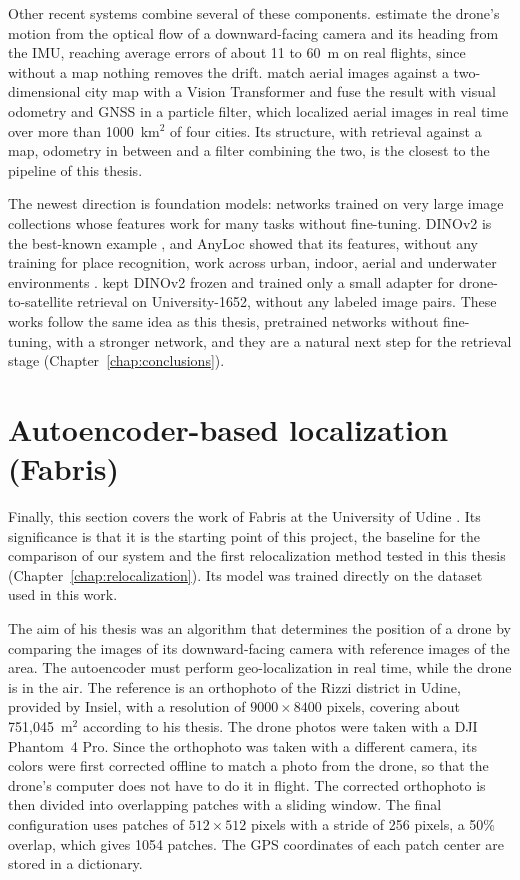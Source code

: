 \documentclass[english, Lau, oneside]{sapthesis}%
\begin{document}
Other recent systems combine several of these components. \citet{walczak2025fusion} estimate the drone's motion from the optical flow of a downward-facing camera and its heading from the IMU, reaching average errors of about 11 to 60~m on real flights, since without a map nothing removes the drift. \citet{tang2025citylevel} match aerial images against a two-dimensional city map with a Vision Transformer and fuse the result with visual odometry and GNSS in a particle filter, which localized aerial images in real time over more than 1000~km$^2$ of four cities. Its structure, with retrieval against a map, odometry in between and a filter combining the two, is the closest to the pipeline of this thesis.

The newest direction is foundation models: networks trained on very large image collections whose features work for many tasks without fine-tuning. DINOv2 is the best-known example \citep{oquab2023dinov2}, and AnyLoc showed that its features, without any training for place recognition, work across urban, indoor, aerial and underwater environments \citep{keetha2023anyloc}. \citet{li2024crossview} kept DINOv2 frozen and trained only a small adapter for drone-to-satellite retrieval on University-1652, without any labeled image pairs. These works follow the same idea as this thesis, pretrained networks without fine-tuning, with a stronger network, and they are a natural next step for the retrieval stage (Chapter~\ref{chap:conclusions}).

\section{Autoencoder-based localization (Fabris)}
\label{sec:bg-fabris}
Finally, this section covers the work of Fabris at the University of Udine \citep{fabris2025thesis}. Its significance is that it is the starting point of this project, the baseline for the comparison of our system and the first relocalization method tested in this thesis (Chapter~\ref{chap:relocalization}). Its model was trained directly on the dataset used in this work.

The aim of his thesis was an algorithm that determines the position of a drone by comparing the images of its downward-facing camera with reference images of the area. The autoencoder must perform geo-localization in real time, while the drone is in the air. The reference is an orthophoto of the Rizzi district in Udine, provided by Insiel, with a resolution of $9000 \times 8400$ pixels, covering about 751{,}045~m$^2$ according to his thesis. The drone photos were taken with a DJI Phantom~4 Pro. Since the orthophoto was taken with a different camera, its colors were first corrected offline to match a photo from the drone, so that the drone's computer does not have to do it in flight. The corrected orthophoto is then divided into overlapping patches with a sliding window. The final configuration uses patches of $512 \times 512$ pixels with a stride of 256 pixels, a 50\% overlap, which gives 1054 patches. The GPS coordinates of each patch center are stored in a dictionary.
\end{document}
